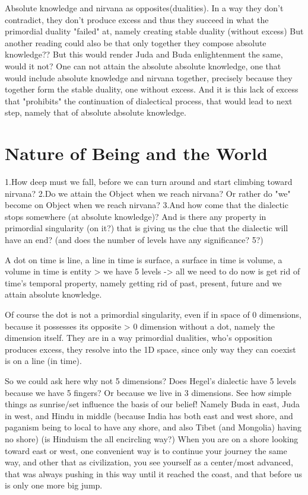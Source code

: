 \documentclass[10pt]{book}
\begin{document}
Absolute knowledge and nirvana as opposites(dualities).
In a way they don't contradict, they don't produce excess and thus they succeed in what the primordial duality "failed" at, namely creating stable duality (without excess) But another reading could also be that only together they compose absolute knowledge?? But this would render Juda and Buda enlightenment the same, would it not?  One can not attain the absolute absolute knowledge, one that would include absolute knowledge and nirvana together, precisely because they together form the stable duality, one without excess. And it is this lack of excess that "prohibits" the continuation of dialectical process, that would lead to next step, namely that of absolute absolute knowledge.

\chapter {Nature of Being and the World}

1.How deep must we fall, before we can turn around and start climbing toward nirvana?
2.Do we attain the Object when we reach nirvana? Or rather do "we" become on Object when we reach nirvana?
3.And how come that the dialectic stops somewhere (at absolute knowledge)? And is there any property in primordial singularity (on it?) that is giving us the clue that the dialectic will have an end? (and does the number of levels have any significance? 5?)

A dot on time is line, a line in time is surface, a surface in time is volume, a volume in time is entity > we have 5 levels -> all we need to do now is get rid of time's temporal property, namely getting rid of past, present, future and we attain absolute knowledge.

Of course the dot is not a primordial singularity, even if in space of 0 dimensions, because it possesses its opposite > 0 dimension without a dot, namely the dimension itself. They are in a way primordial dualities, who's opposition produces excess, they resolve into the 1D space, since only way they can coexist is on a line (in time).

So we could ask here why not 5 dimensions? Does Hegel's dialectic have 5 levels because we have 5 fingers? Or because we live in 3 dimensions.
See how simple things as sunrise/set influence the basis of our belief! Namely Buda in east, Juda in west, and Hindu in middle (because India has both east and west shore, and paganism being to local to have any shore, and also Tibet (and Mongolia) having no shore) (is Hinduism the all encircling way?) When you are on a shore looking toward east or west, one convenient way is to continue your journey the same way, and other that as civilization, you see yourself as a center/most advanced, that was always pushing in this way until it reached the coast, and that before us is only one more big jump. 
\end{document}
